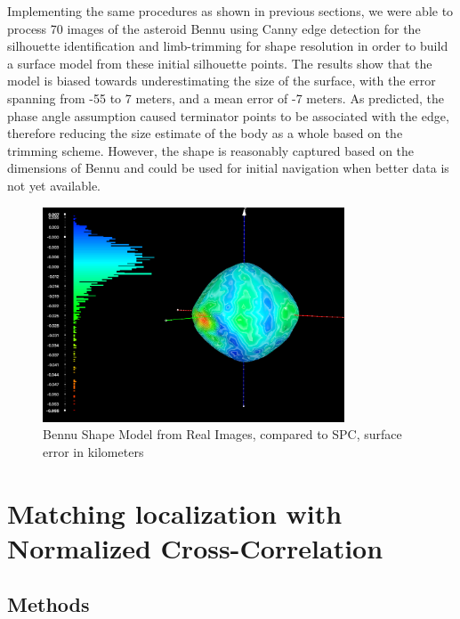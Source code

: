 Implementing the same procedures as shown in previous sections, we were able to process 70 images of the asteroid Bennu using Canny edge detection for the silhouette identification and limb-trimming for shape resolution in order to build a surface model from these initial silhouette points. The results show that the model is biased towards underestimating the size of the surface, with the error spanning from -55 to 7 meters, and a mean error of -7 meters. As predicted, the phase angle assumption caused terminator points to be associated with the edge, therefore reducing the size estimate of the body as a whole based on the trimming scheme. However, the shape is reasonably captured based on the dimensions of Bennu and could be used for initial navigation when better data is not yet available.  

\begin{figure}[h]
    \centering
    \includegraphics[width = 0.8\textwidth]{fig/bennu_real.png}
    \caption{Bennu Shape Model from Real Images, compared to SPC, surface error in kilometers}
    \label{fig:bennu_real}
\end{figure}


\section{Matching localization with Normalized Cross-Correlation}
\subsection{Methods}

